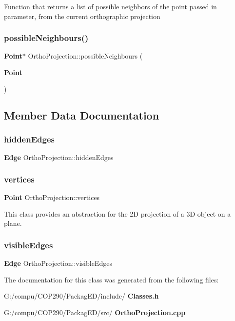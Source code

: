 Function that returns a list of possible neighbors of the point passed in parameter, from the current orthographic projection\mbox{\label{class_ortho_projection_a1b7f34c49143fea8354756f3271caf01}} 
\subsubsection{possible\+Neighbours()\hspace{0.1cm}{\footnotesize\ttfamily [2/2]}}
{\footnotesize\ttfamily \textbf{ Point}$\ast$ Ortho\+Projection\+::possible\+Neighbours (\begin{DoxyParamCaption}\item[{\textbf{ Point}}]{ }\end{DoxyParamCaption})}



\subsection{Member Data Documentation}
\mbox{\label{class_ortho_projection_a986646bfb5af2f2b2546c176ab5b0ef2}} 
\subsubsection{hidden\+Edges}
{\footnotesize\ttfamily \textbf{ Edge} Ortho\+Projection\+::hidden\+Edges}

\mbox{\label{class_ortho_projection_a6a1dc617707e6ba081a0da2afae79045}} 
\subsubsection{vertices}
{\footnotesize\ttfamily \textbf{ Point} Ortho\+Projection\+::vertices}

This class provides an abstraction for the 2D projection of a 3D object on a plane. \mbox{\label{class_ortho_projection_a29bee27443a63b0c78aee098465b60f8}} 
\subsubsection{visible\+Edges}
{\footnotesize\ttfamily \textbf{ Edge} Ortho\+Projection\+::visible\+Edges}



The documentation for this class was generated from the following files\+:\begin{DoxyCompactItemize}
\item 
G\+:/compu/\+C\+O\+P290/\+Packag\+E\+D/include/\textbf{ Classes.\+h}\item 
G\+:/compu/\+C\+O\+P290/\+Packag\+E\+D/src/\textbf{ Ortho\+Projection.\+cpp}\end{DoxyCompactItemize}
